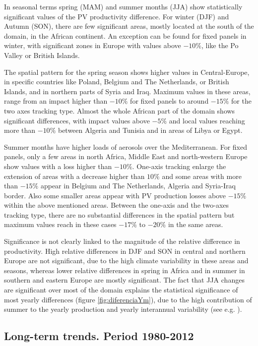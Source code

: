 In seasonal terms spring (MAM) and summer months (JJA) show statistically significant values of the PV productivity difference. For winter (DJF) and Autumn (SON), there are few significant areas, mostly located at the south of the domain, in the African continent. An exception can be found for fixed panels in winter, with significant zones in Europe with values above $-10\%$, like the Po Valley or British Islands. 

The spatial pattern for the spring season shows higher values in Central-Europe, in specific countries like Poland, Belgium and The Netherlands, or British Islands, and in northern parts of Syria and Iraq. Maximum values in these areas, range from an impact higher than $-10\%$ for fixed panels to around $-15\%$ for the two axes tracking type. Almost the whole African part of the domain shows significant differences, with impact values above $-5\%$ and local values reaching more than $-10\%$ between Algeria and Tunisia and in areas of Libya or Egypt. 

Summer months have higher loads of aerosols over the Mediterranean. For fixed panels, only a few areas in north Africa, Middle East and north-western Europe show values with a loss higher than $-10\%$. One-axis tracking enlarge the extension of areas with a decrease higher than $10\%$ and some areas with more than $-15\%$ appear in Belgium and The Netherlands, Algeria and Syria-Iraq border. Also some smaller areas appear with PV production losses above $-15\%$ within the above mentioned areas. Between the one-axis and the two-axes tracking type, there are no substantial differences in the spatial pattern but maximum values reach in these cases $-17\%$ to $-20\%$ in the same areas.

Significance is not clearly linked to the magnitude of the relative difference in productivity. High relative differences in DJF and SON in central and northern Europe are not significant, due to the high climate variability in these areas and seasons, whereas lower relative differences in spring in Africa and in summer in southern and eastern Europe are mostly significant. The fact that JJA changes are significant over most of the domain explains the statistical significance of most yearly differences (figure \ref{fig:diferenciaYm}), due to the high contribution of summer to the yearly production and yearly interannual variability (see e.g. \cite{Gil2015}).


\subsection{Long-term trends. Period 1980-2012}

